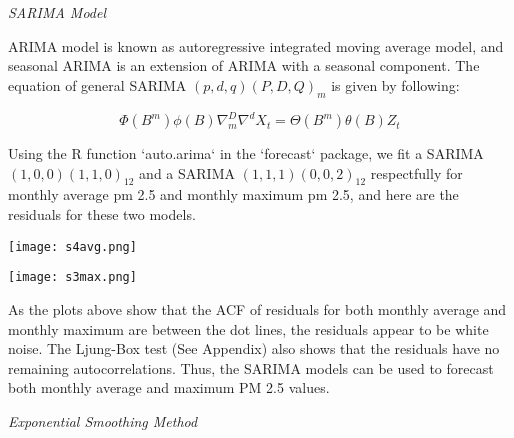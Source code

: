 \documentclass[11pt,]{article}
\begin{document}
\vspace{3mm}

\noindent\emph{SARIMA Model}

\vspace{3mm}

ARIMA model is known as autoregressive integrated moving average model, and seasonal ARIMA is an extension of ARIMA with a seasonal component. The equation of general SARIMA $(p, d, q)(P, D, Q)_{m}$ is given by following:

$$
\Phi\left(B^{m}\right) \phi(B) \nabla_{m}^{D} \nabla^{d} X_{t}=\Theta\left(B^{m}\right) \theta(B) Z_{t}
$$

Using the R function `auto.arima` in the `forecast` package, we fit a SARIMA$(1,0,0)(1,1,0)_{12}$ and a SARIMA $(1,1,1)(0,0,2)_{12}$ respectfully for monthly average pm 2.5 and monthly maximum pm 2.5, and here are the residuals for these two models.

\vspace{3mm}

\begin{minipage}{.45\linewidth}
\begin{flushleft}

{\texttt{[image: s4avg.png]}}

\end{flushleft} 
\end{minipage}
\hfill
\begin{minipage}{.45\linewidth}
\begin{flushright} 

{\texttt{[image: s3max.png]}}


\end{flushright} 
\end{minipage}

\vspace{3mm}

As the plots above show that the ACF of residuals for both monthly average and monthly maximum are between the dot lines, the residuals appear to be white noise. The Ljung-Box test (See Appendix) also shows that the residuals have no remaining autocorrelations. Thus, the SARIMA models can be used to forecast both monthly average and maximum PM 2.5 values. 

\vspace{3mm}

\noindent\emph{Exponential Smoothing Method}

\vspace{3mm}
\end{document}

